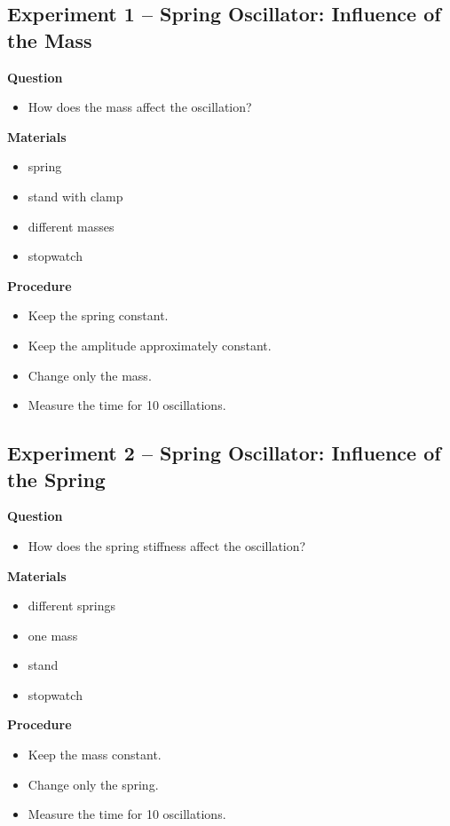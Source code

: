 \documentclass[a4paper,11pt]{article}
\begin{document}
\subsection*{Experiment 1 -- Spring Oscillator: Influence of the Mass}

\textbf{Question}
\begin{itemize}
\item How does the mass affect the oscillation?
\end{itemize}

\textbf{Materials}
\begin{itemize}
\item spring
\item stand with clamp
\item different masses
\item stopwatch 
\end{itemize}

\textbf{Procedure}
\begin{itemize}
\item Keep the spring constant.
\item Keep the amplitude approximately constant.
\item Change only the mass.
\item Measure the time for 10 oscillations.
\end{itemize}

\subsection*{Experiment 2 -- Spring Oscillator: Influence of the Spring}

\textbf{Question}
\begin{itemize}
\item How does the spring stiffness affect the oscillation?
\end{itemize}

\textbf{Materials}
\begin{itemize}
\item different springs
\item one mass
\item stand
\item stopwatch
\end{itemize}

\textbf{Procedure}
\begin{itemize}
\item Keep the mass constant.
\item Change only the spring.
\item Measure the time for 10 oscillations.
\end{itemize}
\end{document}
